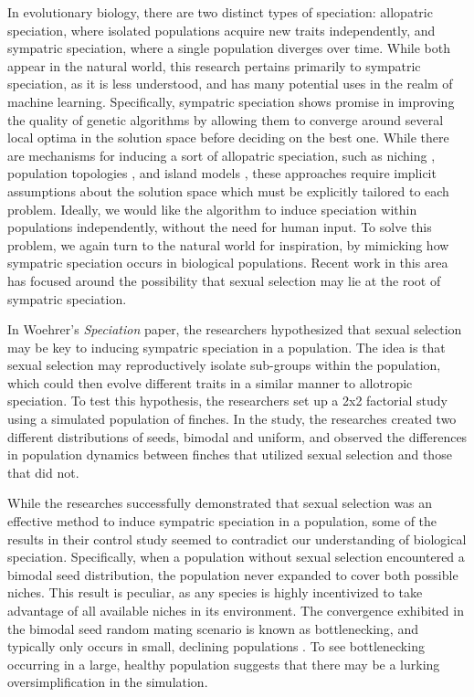 \documentclass{article}
\begin{document}
In evolutionary biology, there are two distinct types of speciation: allopatric speciation, where isolated populations acquire new traits independently, and sympatric speciation, where a single population diverges over time. While both appear in the natural world, this research pertains primarily to sympatric speciation, as it is less understood, and has many potential uses in the realm of machine learning. Specifically, sympatric speciation shows promise in improving the quality of genetic algorithms by allowing them to converge around several local optima in the solution space before deciding on the best one. While there are mechanisms for inducing a sort of allopatric speciation, such as niching \cite{NICHING}, population topologies \cite{TOPOLOGIES}, and island models \cite{ISLAND}, these approaches require implicit assumptions about the solution space which must be explicitly tailored to each problem. Ideally, we would like the algorithm to induce speciation within populations independently, without the need for human input. To solve this problem, we again turn to the natural world for inspiration, by mimicking how sympatric speciation occurs in biological populations. Recent work in this area has focused around the possibility that sexual selection may lie at the root of sympatric speciation.

In Woehrer's \textit{Speciation} paper, the researchers hypothesized that sexual selection may be key to inducing sympatric speciation in a population. The idea is that sexual selection may reproductively isolate sub-groups within the population, which could then evolve different traits in a similar manner to allotropic speciation. To test this hypothesis, the researchers set up a 2x2 factorial study using a simulated population of finches. In the study, the researches created two different distributions of seeds, bimodal and uniform, and observed the differences in population dynamics between finches that utilized sexual selection and those that did not.

While the researches successfully demonstrated that sexual selection was an effective method to induce sympatric speciation in a population, some of the results in their control study seemed to contradict our understanding of biological speciation. Specifically, when a population without sexual selection encountered a bimodal seed distribution, the population never expanded to cover both possible niches. This result is peculiar, as any species is highly incentivized to take advantage of all available niches in its environment. The convergence exhibited in the bimodal seed random mating scenario is known as bottlenecking, and typically only occurs in small, declining populations \cite{CHICKEN}. To see bottlenecking occurring in a large, healthy population suggests that there may be a lurking oversimplification in the simulation.
\end{document}
